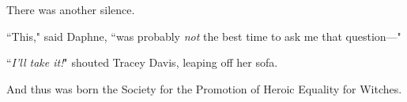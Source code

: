 There was another silence.

``This," said Daphne, ``was probably \emph{not} the best time to ask me that question---"

``\emph{I'll take it!}" shouted Tracey Davis, leaping off her sofa.

\later

And thus was born the Society for the Promotion of Heroic Equality for Witches.

